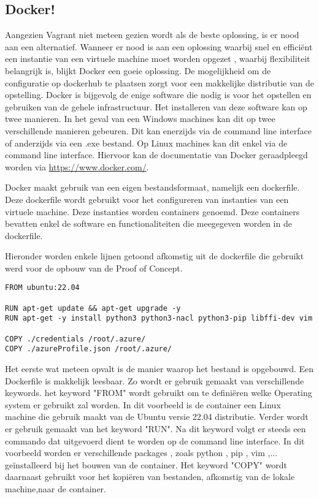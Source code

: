 \subsection{Docker!}
Aangezien Vagrant niet meteen gezien wordt als de beste oplossing, is er nood aan een alternatief. Wanneer er nood is aan een oplossing waarbij snel en efficiënt een instantie van een virtuele machine moet worden opgezet , waarbij flexibiliteit belangrijk is, blijkt Docker een goeie oplossing. De mogelijkheid om de configuratie op dockerhub te plaatsen zorgt voor een makkelijke distributie van de opstelling. Docker is bijgevolg de enige software die nodig is voor het opstellen en gebruiken van de gehele infrastructuur. Het installeren van deze software kan op twee manieren. In het geval van een Windows machines kan dit op twee verschillende manieren gebeuren. Dit kan enerzijds via de command line interface of anderzijds via een .exe bestand. Op Linux machines kan dit enkel via de command line interface. Hiervoor kan de documentatie van Docker geraadpleegd worden via \url{ https://www.docker.com/}. \newline

Docker maakt gebruik van een eigen bestandsformaat, namelijk een dockerfile. Deze dockerfile wordt gebruikt voor het configureren van instanties van een virtuele machine. Deze instanties worden containers genoemd. Deze containers bevatten enkel de software en functionaliteiten die meegegeven worden in de dockerfile. \newline

Hieronder worden enkele lijnen getoond afkomstig uit de dockerfile die gebruikt werd voor de opbouw van de Proof of Concept. 

\begin{verbatim}
FROM ubuntu:22.04

RUN apt-get update && apt-get upgrade -y
RUN apt-get -y install python3 python3-nacl python3-pip libffi-dev vim

COPY ./credentials /root/.azure/
COPY ./azureProfile.json /root/.azure/
\end{verbatim}
Het eerste wat meteen opvalt is de manier waarop het bestand is opgebouwd. Een Dockerfile is makkelijk leesbaar. Zo wordt er gebruik gemaakt van verschillende keywords. het keyword "FROM" wordt gebruikt om te definiëren welke Operating system er gebruikt zal worden. In dit voorbeeld is de container een Linux machine die gebruik maakt van de Ubuntu versie 22.04 distributie. Verder wordt er gebruik gemaakt van het keyword "RUN". Na dit keyword volgt er steeds een commando dat uitgevoerd dient te worden op de command line interface. In dit voorbeeld worden er verschillende packages , zoals python , pip , vim ,... geïnstalleerd bij het bouwen van de container. Het keyword "COPY" wordt daarnaast gebruikt voor het kopiëren van bestanden, afkomstig van de lokale machine,naar de container. 

